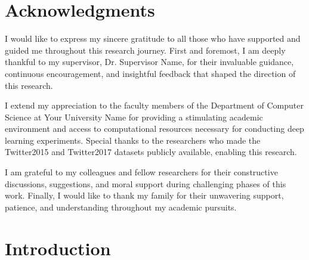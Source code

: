\documentclass[12pt,a4paper]{report}
\begin{document}
\cleardoublepage

\chapter*{Acknowledgments}
\thispagestyle{empty}

I would like to express my sincere gratitude to all those who have supported and guided me throughout this research journey. First and foremost, I am deeply thankful to my supervisor, Dr. Supervisor Name, for their invaluable guidance, continuous encouragement, and insightful feedback that shaped the direction of this research.

I extend my appreciation to the faculty members of the Department of Computer Science at Your University Name for providing a stimulating academic environment and access to computational resources necessary for conducting deep learning experiments. Special thanks to the researchers who made the Twitter2015 and Twitter2017 datasets publicly available, enabling this research.

I am grateful to my colleagues and fellow researchers for their constructive discussions, suggestions, and moral support during challenging phases of this work. Finally, I would like to thank my family for their unwavering support, patience, and understanding throughout my academic pursuits.

\cleardoublepage

\tableofcontents
\cleardoublepage

\listoffigures
{}
\cleardoublepage

\listoftables
{}
\cleardoublepage

\setcounter{page}{1}

\chapter{Introduction}
\end{document}
